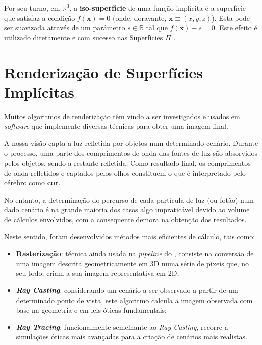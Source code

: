 Por seu turno, em $\mathbb{R}^3$, a \textbf{iso-superfície} de uma função implícita é a superfície que satisfaz a condição $f(\mathbf{x}) = 0$ (onde, doravante, $\mathbf{x} \equiv (x,y,z)$). Esta pode ser suavizada através de um parâmetro $s \in \mathbb{R}$ tal que $f(\mathbf{x}) - s = 0$. Este efeito é utilizado diretamente e com sucesso nas Superfícies $\Pi$ \cite{Raposo2019}.






\section{Renderização de Superfícies Implícitas}
\label{sec::arte:render}

Muitos algoritmos de renderização têm vindo a ser investigados e usados em \textit{software} que implemente diversas técnicas para obter uma imagem final.

A nossa visão capta a luz refletida por objetos num determinado cenário. Durante o processo, uma parte dos comprimentos de onda das fontes de luz são absorvidos pelos objetos, sendo a restante refletida. Como resultado final, os comprimentos de onda refletidos e captados pelos olhos constituem o que é interpretado pelo cérebro como \textbf{cor}.

No entanto, a determinação do percurso de cada partícula de luz (ou fotão) num dado cenário é na grande maioria dos casos algo impraticável devido ao volume de cálculos envolvidos, com a consequente demora na obtenção dos resultados.

Neste sentido, foram desenvolvidos métodos mais eficientes de cálculo, tais como:

\begin{itemize}
    \item \textbf{Rasterização}: técnica ainda usada na \textit{pipeline} do \opengl, consiste na conversão de uma imagem descrita geometricamente em 3D numa série de pixeis que, no seu todo, criam a sua imagem representativa em 2D;
    
    \item \textbf{\itshape Ray Casting}: considerando um cenário a ser observado a partir de um determinado ponto de vista, este algoritmo calcula a imagem observada com base na geometria e em leis óticas fundamentais;
    
    \item \textbf{\itshape Ray Tracing}: funcionalmente semelhante ao \textit{Ray Casting}, recorre a simulações óticas mais avançadas para a criação de cenários mais realistas.
\end{itemize}

